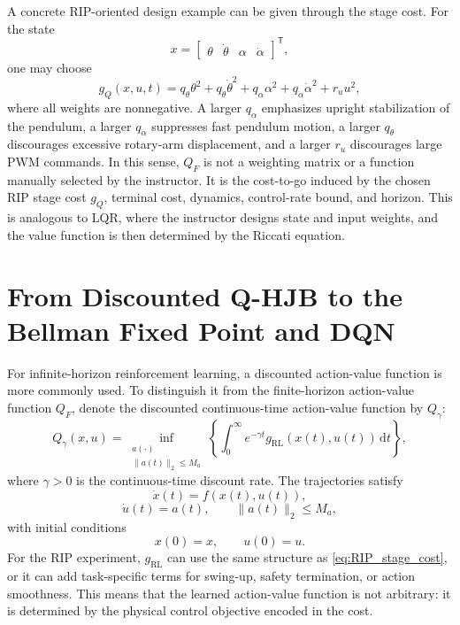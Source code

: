 \documentclass[11pt]{article}
\begin{document}
A concrete RIP-oriented design example can be given through the stage cost. For the state
\begin{equation}
x=
\begin{bmatrix}
\theta & \dot{\theta} & \alpha & \dot{\alpha}
\end{bmatrix}^{\mathsf T},
\label{eq:rip_state_Q}
\end{equation}
one may choose
\begin{equation}
g_Q(x,u,t)
=q_{\theta}\theta^2
+q_{\dot{\theta}}\dot{\theta}^{2}
+q_{\alpha}\alpha^2
+q_{\dot{\alpha}}\dot{\alpha}^{2}
+r_uu^2,
\label{eq:RIP_stage_cost}
\end{equation}
where all weights are nonnegative. A larger $q_{\alpha}$ emphasizes upright stabilization of the pendulum, a larger $q_{\dot{\alpha}}$ suppresses fast pendulum motion, a larger $q_{\theta}$ discourages excessive rotary-arm displacement, and a larger $r_u$ discourages large PWM commands. In this sense, $Q_F$ is not a weighting matrix or a function manually selected by the instructor. It is the cost-to-go induced by the chosen RIP stage cost $g_Q$, terminal cost, dynamics, control-rate bound, and horizon. This is analogous to LQR, where the instructor designs state and input weights, and the value function is then determined by the Riccati equation.

\section{From Discounted Q-HJB to the Bellman Fixed Point and DQN}

For infinite-horizon reinforcement learning, a discounted action-value function is more commonly used. To distinguish it from the finite-horizon action-value function $Q_F$, denote the discounted continuous-time action-value function by $Q_{\gamma}$:
\begin{equation}
Q_{\gamma}(x,u)
=
\inf_{\substack{a(\cdot)\\ \|a(t)\|_2\leq M_a}}
\left\{
\int_0^{\infty} e^{-\gamma t}
 g_{\mathrm{RL}}(x(t),u(t))\,\mathrm{d}t
\right\},
\label{eq:Qgamma}
\end{equation}
where $\gamma>0$ is the continuous-time discount rate. The trajectories satisfy
\begin{equation}
\dot{x}(t)=f(x(t),u(t)),
\label{eq:discount_x_dyn}
\end{equation}
\begin{equation}
\dot{u}(t)=a(t),
\qquad \|a(t)\|_2\leq M_a,
\label{eq:discount_u_dyn}
\end{equation}
with initial conditions
\begin{equation}
x(0)=x,
\qquad u(0)=u.
\label{eq:discount_initial}
\end{equation}
For the RIP experiment, $g_{\mathrm{RL}}$ can use the same structure as \eqref{eq:RIP_stage_cost}, or it can add task-specific terms for swing-up, safety termination, or action smoothness. This means that the learned action-value function is not arbitrary: it is determined by the physical control objective encoded in the cost.
\end{document}
